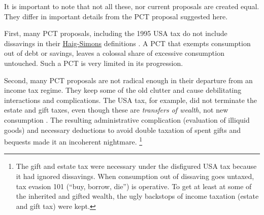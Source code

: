 


It is important to note that not all these, nor current proposals are created equal.
They differ in important details from the PCT proposal suggested here.

First, many PCT proposals, including the 1995 USA tax do not include dissavings in their \hyperref[eq:HaigSimonsPCT]{Haig-Simons} definitions \citep[18]{Bank2004}.
A PCT that exempts consumption out of debt or savings, leaves a colossal share of excessive consumption untouched.
Such a PCT is very limited in its progression.

Second, many PCT proposals are not radical enough in their departure from an income tax regime.
They keep some of the old clutter and cause debilitating interactions and complications.
The USA tax, for example, did not terminate the estate and gift taxes, even though these are \emph{transfers of wealth}, not new consumption \citep[19]{Bank2004}.
The resulting administrative complication (evaluation of illiquid goods) and necessary deductions to avoid double taxation of spent gifts and bequests made it an incoherent nightmare.
\footnote{
	The gift and estate tax were necessary under the disfigured USA tax because it had ignored dissavings.
	When consumption out of dissaving goes untaxed, tax evasion 101 (``buy, borrow, die'') is operative.
	To get at least at some of the inherited and gifted wealth, the ugly backstops of income taxation (estate and gift tax) were kept.
}

